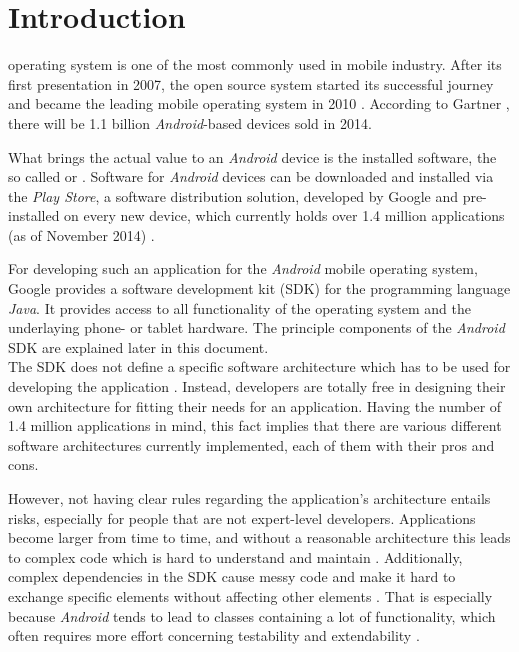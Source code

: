 \section{Introduction}

 operating system is one of the most 
commonly used in mobile industry. After its first presentation in 2007, the open source system started its successful journey and became the leading mobile operating system in 2010 \cite{PassiveMVC}. According to Gartner \cite{GartnerAndroid2014}, there will be 1.1 billion \emph{Android}-based devices sold in 2014.

What brings the actual value to an \emph{Android} device is the installed software, the so called  or 
.
Software for \emph{Android} devices can be downloaded and installed via the 
\emph{Play Store}, a software distribution solution, developed by Google and 
pre-installed on every new device, which currently holds over 1.4 million 
applications (as of November 2014) \cite{AppBrainStats}.


For developing such an application for the \emph{Android} mobile operating 
system, Google provides a software development kit (SDK) for the programming 
language \emph{Java}. It provides access to all functionality of the 
operating system and the underlaying phone- or tablet hardware. The principle components of the \emph{Android} SDK are explained later in this document.\\


The SDK does not define a specific software architecture which has to 
be used for developing the application \cite{AndroidDeveloperCollection}. Instead, developers are totally free in 
designing their own architecture for fitting their needs for an application.
Having the number of 1.4 million applications in mind, this fact implies that 
there are various different software architectures currently implemented, each 
of them with their pros and cons. 

However, not having clear rules regarding the application's architecture entails risks, especially for people that are not expert-level developers. Applications become larger from time to time, and without a reasonable architecture this leads to complex code which is hard to understand and maintain \cite{PassiveMVC, BallOfMud}. Additionally, complex dependencies in the SDK cause messy code and make it hard to exchange specific elements without affecting other elements \cite{PassiveMVC}. That is especially because \emph{Android} tends to lead to classes containing a lot of functionality, which often requires more effort concerning testability and extendability \cite{GangOfFour}.

